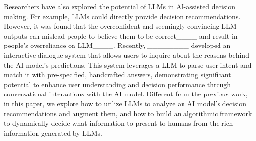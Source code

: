 Researchers have also explored the potential of LLMs in AI-assisted decision making. For example, LLMs could directly provide decision recommendations. However, it was found that the 
overconfident and seemingly convincing LLM outputs can mislead people to believe them to be correct____ and result in people's overreliance on LLM____. 
Recently, ________ developed an interactive dialogue system that allows users to inquire about the reasons behind the AI model's predictions. This system leverages a LLM to parse user intent and match it with pre-specified, handcrafted answers, demonstrating significant potential to enhance user understanding and decision performance through conversational interactions with the AI model.
Different from the previous work, %
in this paper, we explore 
how to utilize LLMs to analyze an AI model's decision recommendations and augment them, and 
how to build an algorithmic framework to dynamically decide what information to present to humans from the rich information generated by LLMs.
